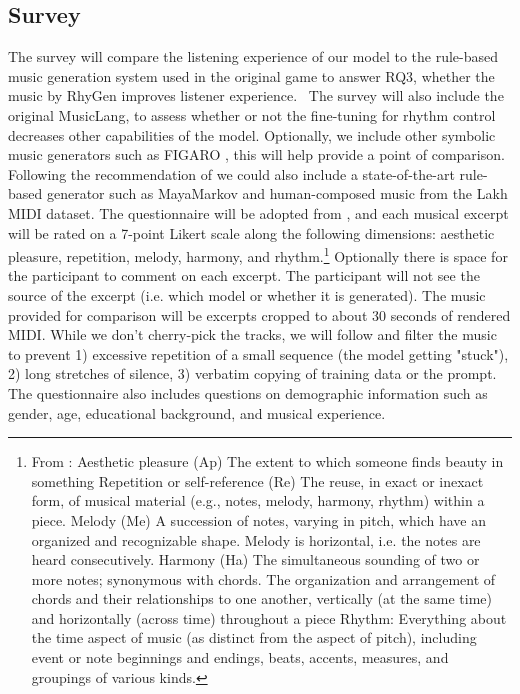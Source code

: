 \subsection{Survey}
The survey will compare the listening experience of our model to the rule-based music generation system used in the original game to answer RQ3, whether the music by RhyGen improves listener experience.  The survey will also include the original MusicLang, to assess whether or not the fine-tuning for rhythm control decreases other capabilities of the model. Optionally, we include other symbolic music generators such as FIGARO \cite{Rütte_figaro_2023}, this will help provide a point of comparison. Following the recommendation of \cite{Yin_Reuben_Stepney_Collins_2023} we could also include a state-of-the-art rule-based generator such as MayaMarkov \cite{Collins_Laney_2017} and human-composed music from the Lakh MIDI dataset. 
The questionnaire will be adopted from \cite{Yin_Reuben_Stepney_Collins_2023}, and each musical excerpt will be rated on a 7-point Likert scale along the following dimensions: aesthetic pleasure, repetition, melody, harmony, and rhythm.\footnote{From \cite{Yin_Reuben_Stepney_Collins_2023}: Aesthetic pleasure (Ap) The extent to which someone finds beauty in something 
Repetition or self-reference (Re) The reuse, in exact or inexact form, of musical material (e.g., notes, melody, harmony, rhythm) within a piece.
Melody (Me) A succession of notes, varying in pitch, which have an organized and recognizable shape. Melody is horizontal, i.e. the notes are heard consecutively.
Harmony (Ha) The simultaneous sounding of two or more notes; synonymous with chords. The organization and arrangement of chords and their relationships
to one another, vertically (at the same time) and horizontally (across time) throughout a piece
Rhythm: Everything about the time aspect of music (as distinct from the aspect of pitch), including event or note beginnings and endings, beats, accents, measures, and groupings of various kinds.} 
Optionally there is space for the participant to comment on each excerpt. The participant will not see the source of the excerpt (i.e. which model or whether it is generated). 
The music provided for comparison will be excerpts cropped to about 30 seconds of rendered MIDI. While we don't cherry-pick the tracks, we will follow \cite{Yin_Reuben_Stepney_Collins_2023} and filter the music to prevent 1) excessive repetition of a small sequence (the model getting "stuck"), 2) long stretches of silence, 3) verbatim copying of training data or the prompt. 
The questionnaire also includes questions on demographic information such as gender, age, educational background, and musical experience.

